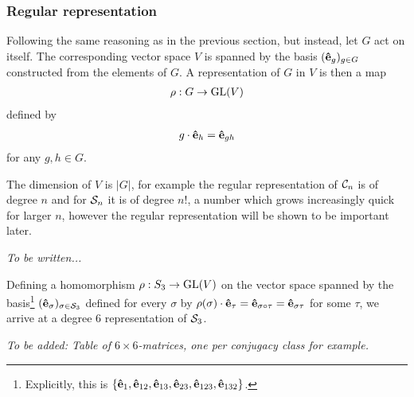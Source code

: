 \subsubsection{Regular representation}

	Following the same reasoning as in the previous section, but instead, let $G$ act on itself. The corresponding vector space $V$ is spanned by the basis $(\mathbf{\hat{e}}_g)_{g \in G}$ constructed from the elements of $G$. A representation of $G$ in $V$ is then a map
	\begin{align*}
		\rho: G \rightarrow \text{GL}(V)
	\end{align*}
	defined by
	\begin{align*}
		g \cdot \mathbf{\hat{e}}_h = \mathbf{\hat{e}}_{gh}
	\end{align*}
	for any $g,h \in G$.
	
	The dimension of $V$ is $|G|$, for example the regular representation of $\mathcal{C}_n$ is of degree $n$ and for $\mathcal{S}_n$ it is of degree $n!$, a number which grows increasingly quick for larger $n$, however the regular representation will be shown to be important later.
	
	\begin{example}
		\textit{To be written...}
	\end{example}
	
	\begin{example}
		Defining a homomorphism $\rho: S_3 \rightarrow \text{GL}(V)$ on the vector space spanned by the basis\footnote{Explicitly, this is $\left\lbrace \mathbf{\hat{e}}_1, \mathbf{\hat{e}}_{12}, \mathbf{\hat{e}}_{13}, \mathbf{\hat{e}}_{23}, \mathbf{\hat{e}}_{123}, \mathbf{\hat{e}}_{132} \right\rbrace$.} $(\mathbf{\hat{e}}_{\sigma})_{\sigma \in \mathcal{S}_3}$ defined for every $\sigma$ by $\rho(\sigma) \cdot \mathbf{\hat{e}}_\tau = \mathbf{\hat{e}}_{\sigma \circ \tau} = \mathbf{\hat{e}}_{\sigma\tau}$ for some $\tau$, we arrive at a degree 6 representation of $\mathcal{S}_3$. %
		
		\textit{To be added: Table of $6 \times 6$-matrices, one per conjugacy class for example.}
	\end{example}
	
	

